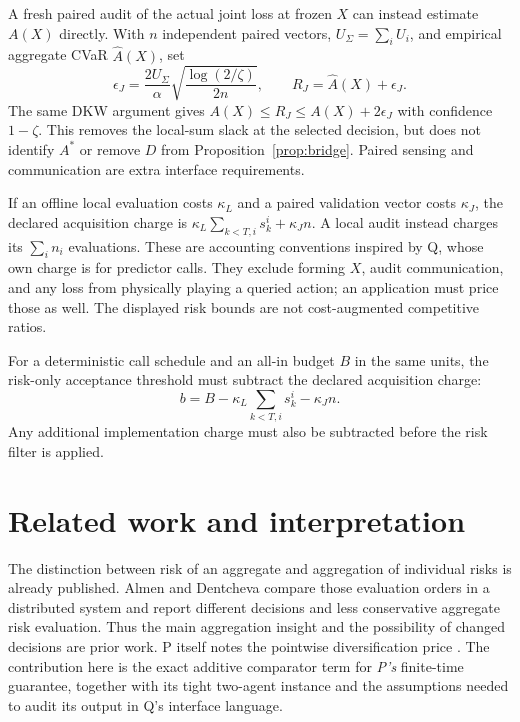 \documentclass{article}
\begin{document}
A fresh paired audit of the actual joint loss at frozen \(X\) can
instead estimate \(A(X)\) directly.  With \(n\) independent paired
vectors, \(U_\Sigma=\sum_iU_i\), and empirical aggregate CVaR
\(\widehat A(X)\), set
\[
\epsilon_J=\frac{2U_\Sigma}{\alpha}
\sqrt{\frac{\log(2/\zeta)}{2n}},
\qquad R_J=\widehat A(X)+\epsilon_J.
\]
The same DKW argument gives
\(A(X)\le R_J\le A(X)+2\epsilon_J\) with confidence
\(1-\zeta\).  This removes the local-sum slack at the selected
decision, but does not identify \(A^*\) or remove \(D\) from
Proposition~\ref{prop:bridge}.  Paired sensing and communication are
extra interface requirements.

If an offline local evaluation costs \(\kappa_L\) and a paired
validation vector costs \(\kappa_J\), the declared acquisition charge
is \(\kappa_L\sum_{k<T,i}s_k^i+\kappa_Jn\).  A local audit instead
charges its \(\sum_i n_i\) evaluations.  These are accounting
conventions inspired by Q, whose own charge is for predictor calls.
They exclude forming \(X\), audit communication, and any loss from
physically playing a queried action; an application must price those
as well.  The displayed risk bounds are not cost-augmented competitive
ratios.

For a deterministic call schedule and an all-in budget \(B\) in the
same units, the risk-only acceptance threshold must subtract the
declared acquisition charge:
\[
b=B-\kappa_L\sum_{k<T,i}s_k^i-\kappa_Jn.
\]
Any additional implementation charge must also be subtracted before
the risk filter is applied.

\section{Related work and interpretation}

The distinction between risk of an aggregate and aggregation of
individual risks is already published.  Almen and Dentcheva
\cite{AlmenDentcheva} compare those evaluation orders in a distributed
system and report different decisions and less conservative aggregate
risk evaluation.  Thus the main aggregation insight and the
possibility of changed decisions are prior work.  P itself notes the
pointwise diversification price \cite{P}.  The contribution here is
the exact additive comparator term for \emph{P's} finite-time
guarantee, together with its tight two-agent instance and the
assumptions needed to audit its output in Q's interface language.
\end{document}

